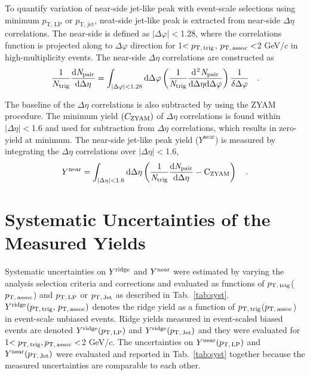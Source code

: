 To quantify variation of near-side jet-like peak with event-scale selections using minimum $p_\mathrm{T,\,LP}$ or $p_\mathrm{T,\,jet}$, neat-side jet-like peak is extracted from near-side $\Delta\eta$ correlations. The near-side is defined as $|\Delta\varphi|<$1.28, where the correlations function is projected along to $\Delta\varphi$ direction for 1$<p_\mathrm{T,\,trig}$, $p_\mathrm{T,\,assoc}<$2 GeV/$c$ in high-multiplicity events. The near-side $\Delta\eta$ correlations are constructed as
\begin{eqnarray}
\frac{1}{N_{\rm{trig}}} \frac{ \rm{d}\it{}N_{\rm{pair}} }{ \rm{d}\Delta\eta } = \int_{|\Delta \varphi|<1.28} \rm{d} \Delta \varphi \left( \frac{1}{\it{N}_{\rm{trig}}} \frac{ \rm{d}\it{}^{2} N_{\rm{pair}} }{ \rm{d}\Delta\eta d\Delta\varphi} \right) \dfrac{1}{\delta\Delta\varphi} \quad. 
\end{eqnarray}

The baseline of the $\Delta\eta$ correlations is also subtracted by using the ZYAM procedure. The minimum yield $(C_{\rm{ZYAM}})$ of $\Delta\eta$ correlations is found within $|\Delta\eta|<$1.6 and used for subtraction from  $\Delta\eta$ correlations, which results in zero-yield at minimum. The near-side jet-like peak yield ($Y^{\mathrm{near}}$) is measured by integrating the $\Delta\eta$ correlations over $|\Delta\eta|<$1.6,
\begin{eqnarray}
Y^{\rm{near}} = \int_{|\Delta \eta|<1.6} \rm{d} \Delta\eta \left( \frac{1}{\it{N}_{\rm{trig}}} \frac{ \rm{d}\it{}N_{\rm{pair}} }{ \rm{d}\Delta\eta } - C_{\rm{ZYAM}} \right)\quad.
\end{eqnarray}



\section{Systematic Uncertainties of the Measured Yields}
\label{sec:uncertainties}

Systematic uncertainties on $Y^{\rm{ridge}}$ and $Y^{\rm{near}}$ were estimated by varying the analysis selection criteria and corrections and evaluated as functions of $p_\mathrm{T,\,trig}$($p_\mathrm{T,\,assoc}$) and $p_\mathrm{T,\,LP}$ or $p_\mathrm{T,\,Jet}$ as described in Tab.~\ref{tab:syst}. $Y^{\rm{ridge}}(p_\mathrm{T,\,trig},\,p_\mathrm{T,\,assoc})$ denotes the ridge yield as a function of $p_\mathrm{T,\,trig}$($p_\mathrm{T,\,assoc}$) in event-scale unbiased events. Ridge yields measured in event-scaled biased events are denoted $Y^{\rm{ridge}}(p_\mathrm{T,\,LP})$ and $Y^{\rm{ridge}}(p_\mathrm{T,\,Jet})$ and they were evaluated for 1$<p_\mathrm{T,\,trig}, p_\mathrm{T,\,assoc}<$2 GeV/$c$. The uncertainties on $Y^{\rm{near}}(p_\mathrm{T,\,LP})$ and $Y^{\rm{near}}(p_\mathrm{T,\,Jet})$ were evaluated and reported in Tab.~\ref{tab:syst} together because the measured uncertainties are comparable to each other.


